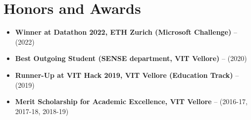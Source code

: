 \section{Honors and Awards}

\vspace{1pt}

\begin{itemize}
\item \textbf{Winner at Datathon 2022, ETH Zurich (Microsoft Challenge)} -- (2022)
\item \textbf{Best Outgoing Student (SENSE department, VIT Vellore)} -- (2020)
\item \textbf{Runner-Up at VIT Hack 2019, VIT Vellore (Education Track)} -- (2019)
\item \textbf{Merit Scholarship for Academic Excellence, VIT Vellore } -- (2016-17, 2017-18, 2018-19)

\end{itemize}